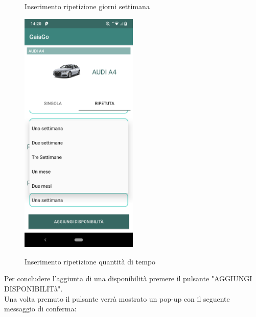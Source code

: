 \begin{itemize}
\begin{figure}[H]
		\caption{Inserimento ripetizione giorni settimana}
		\label{disponibilità2}
	\end{figure}
	\begin{figure}[H] 
		\centering 
		\includegraphics[width=0.5\textwidth]{res/images/aggiungi_disponibilita5.png}\\
		\caption{Inserimento ripetizione quantità di tempo}
		\label{disponibilità3}
	\end{figure}
\end{itemize}
Per concludere l'aggiunta di una disponibilità premere il pulsante "AGGIUNGI DISPONIBILITà".\\
Una volta premuto il pulsante verrà mostrato un pop-up con il seguente messaggio di conferma:
